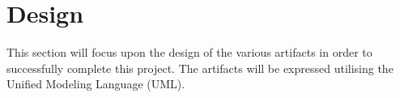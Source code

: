 \chapter{Design}

This section will focus upon the design of the various artifacts in order to 
successfully complete this project. The artifacts will be expressed utilising 
the Unified Modeling Language (UML).

\newpage


\newpage


\newpage


\newpage


\newpage

